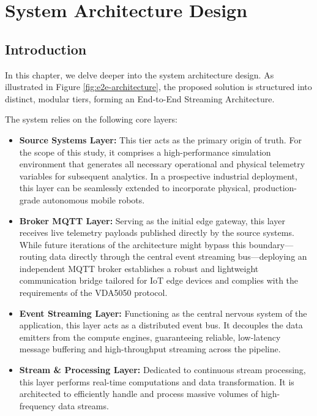 \chapter{System Architecture Design}
\label{chap:system_architecture}

\section{Introduction}

In this chapter, we delve deeper into the system architecture design.
As illustrated in Figure \ref{fig:e2e-architecture}, the proposed solution is structured into distinct, modular tiers, forming an End-to-End Streaming Architecture.

The system relies on the following core layers:
\begin{itemize}
    \item \textbf{Source Systems Layer:} This tier acts as the primary origin of truth.
    For the scope of this study, it comprises a high-performance simulation environment that generates all necessary operational and physical telemetry variables for subsequent analytics.
    In a prospective industrial deployment, this layer can be seamlessly extended to incorporate physical, production-grade autonomous mobile robots.

    \item \textbf{Broker MQTT Layer:} Serving as the initial edge gateway, this layer receives live telemetry payloads published directly by the source systems.
    While future iterations of the architecture might bypass this boundary—routing data directly through the central event streaming bus—deploying an independent MQTT broker establishes a robust and lightweight communication bridge tailored for IoT edge devices and complies with the requirements of the VDA5050 protocol.

    \item \textbf{Event Streaming Layer:} Functioning as the central nervous system of the application, this layer acts as a distributed event bus.
    It decouples the data emitters from the compute engines, guaranteeing reliable, low-latency message buffering and high-throughput streaming across the pipeline.

    \item \textbf{Stream \& Processing Layer:} Dedicated to continuous stream processing, this layer performs real-time computations and data transformation.
    It is architected to efficiently handle and process massive volumes of high-frequency data streams.


\end{itemize}
